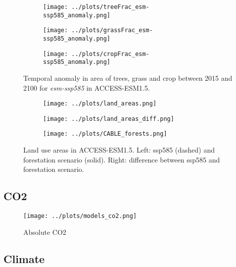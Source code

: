 \documentclass[]{article}
\begin{document}
\begin{figure}[H]
    \centering
    \begin{subfigure}[b]{0.4\linewidth}
        \texttt{[image: ../plots/treeFrac\_esm-ssp585\_anomaly.png]}
    \end{subfigure}
    \begin{subfigure}[b]{0.4\linewidth}
        \texttt{[image: ../plots/grassFrac\_esm-ssp585\_anomaly.png]}
    \end{subfigure}
    \begin{subfigure}[b]{0.4\linewidth}
        \texttt{[image: ../plots/cropFrac\_esm-ssp585\_anomaly.png]}
    \end{subfigure}
    \caption{Temporal anomaly in area of trees, grass and crop between 2015 and 2100 for \textit{esm-ssp585} in ACCESS-ESM1.5.
    }
    \label{fig:ACCESS_land_cover}
\end{figure}

\begin{figure}[H]
    \centering
    \begin{subfigure}[b]{0.45\linewidth}
        \texttt{[image: ../plots/land\_areas.png]}
    \end{subfigure}
    \begin{subfigure}[b]{0.45\linewidth}
        \texttt{[image: ../plots/land\_areas\_diff.png]}
    \end{subfigure}
    \begin{subfigure}[b]{0.45\linewidth}
        \texttt{[image: ../plots/CABLE\_forests.png]}
    \end{subfigure}
    \caption{Land use areas in ACCESS-ESM1.5. Left: ssp585 (dashed) and forestation scenario (solid). Right: difference between ssp585 and forestation scenario.}
    \label{fig:ACCESS_land_use}
\end{figure}

\subsection{CO2}

\begin{figure}[H]
    \centering
    \texttt{[image: ../plots/models\_co2.png]}
    \caption{Absolute CO2}
    \label{fig:models_co2_absolute}
\end{figure}

\subsection{Climate}
\end{document}
